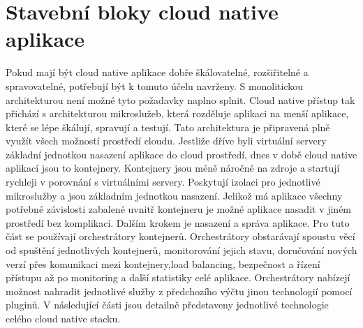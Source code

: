 \section{Stavební bloky cloud native aplikace}
		Pokud mají být cloud native aplikace dobře škálovatelné, rozšiřitelné a spravovatelné, potřebují být k tomuto účelu navrženy. S monolitickou architekturou není možné tyto požadavky naplno splnit. Cloud native přístup tak přichází s architekturou \linebreak mikroslužeb, která rozděluje aplikaci na menší aplikace, které se lépe škálují, spravují a testují. Tato architektura je připravená plně využít všech možností prostředí cloudu. Jestliže dříve byli virtuální servery základní jednotkou nasazení aplikace do cloud \linebreak prostředí, dnes v době cloud native aplikací jsou to kontejnery. Kontejnery jsou méně náročné na zdroje a startují rychleji v porovnání s virtuálními servery. Poskytují izolaci pro jednotlivé mikroslužby a jsou základním jednotkou nasazení. Jelikož má aplikace všechny potřebné závislosti zabalené uvnitř kontejneru je možné aplikace \linebreak nasadit v jiném prostředí bez komplikací. Dalším krokem je nasazení a správa aplikace. Pro tuto část se používají orchestrátory kontejnerů. Orchestrátory obstarávají spoustu věcí od spuštění jednotlivých kontejnerů, monitorování jejich stavu, doručování nových verzí přes komunikaci mezi kontejnery,load balancing, bezpečnost a řízení přístupu až po monitoring a další statistiky celé aplikace. Orchestrátory nabízejí možnost nahradit jednotlivé služby z předchozího výčtu jinou technologií pomocí pluginů. V následující části jsou detailně představeny jednotlivé technologie celého cloud native stacku.

